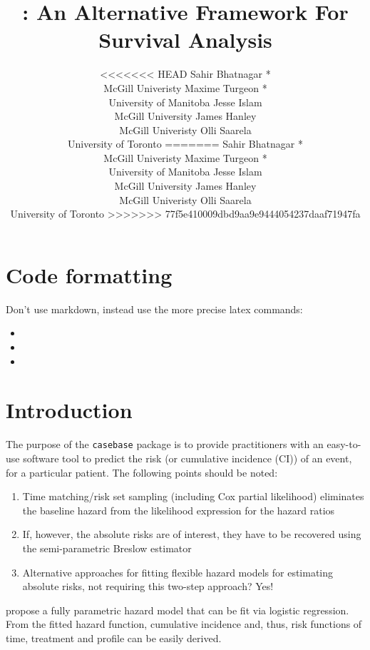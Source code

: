 \documentclass[
]{jss}
\author{
<<<<<<< HEAD
Sahir Bhatnagar *\\McGill Univeristy \And Maxime Turgeon *\\University of Manitoba \And Jesse Islam\\McGill University \And James Hanley\\McGill Univeristy \And Olli Saarela\\University of Toronto
=======
Sahir Bhatnagar *\\McGill Univeristy \And Maxime Turgeon *\\University of Manitoba \AND Jesse Islam\\McGill University \And James Hanley\\McGill Univeristy \And Olli Saarela\\University of Toronto
>>>>>>> 77f5e410009dbd9aa9e9444054237daaf71947fa
}
\title{\pkg{casebase}: An Alternative Framework For Survival Analysis}
\providecommand{\tightlist}{%
  \setlength{\itemsep}{0pt}\setlength{\parskip}{0pt}}
\begin{document}
\hypertarget{code-formatting}{%
\section*{Code formatting}\label{code-formatting}}

Don't use markdown, instead use the more precise latex commands:

\begin{itemize}
\item
\item
\item
\end{itemize}

\hypertarget{introduction}{%
\section{Introduction}\label{introduction}}

The purpose of the \texttt{casebase} package is to provide practitioners
with an easy-to-use software tool to predict the risk (or cumulative
incidence (CI)) of an event, for a particular patient. The following
points should be noted:

\begin{enumerate}
\def\labelenumi{\arabic{enumi}.}
\tightlist
\item
  Time matching/risk set sampling (including Cox partial likelihood)
  eliminates the baseline hazard from the likelihood expression for the
  hazard ratios
\item
  If, however, the absolute risks are of interest, they have to be
  recovered using the semi-parametric Breslow estimator
\item
  Alternative approaches for fitting flexible hazard models for
  estimating absolute risks, not requiring this two-step approach? Yes!
  \citep{hanley2009fitting}
\end{enumerate}

\citep{hanley2009fitting} propose a fully parametric hazard model that
can be fit via logistic regression. From the fitted hazard function,
cumulative incidence and, thus, risk functions of time, treatment and
profile can be easily derived.
\end{document}
